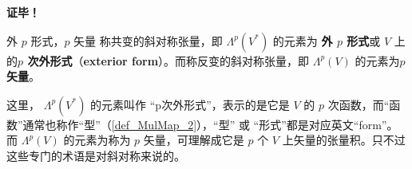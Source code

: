\textbf{证毕！}

\begin{definition}{外 $p$ 形式，$p$ 矢量}\label{def_SIofTe_2}
称共变的斜对称张量，即 $\Lambda^p(V^*)$ 的元素为 \textbf{外 $p$ 形式}或 $V$ 上的\textbf{$p$ 次外形式}（\textbf{exterior form}）。而称反变的斜对称张量，即 $\Lambda^p(V)$ 的元素为\textbf{$p$矢量}。
\end{definition}

这里， $\Lambda^p(V^*)$ 的元素叫作 “p次外形式”，表示的是它是 $V$ 的 $p$ 次函数，而“函数”通常也称作“型”（\autoref{def_MulMap_2}），“型” 或 “形式”都是对应英文“form”。而 $\Lambda^p(V)$ 的元素为称为 $p$ 矢量，可理解成它是 $p$ 个 $V$ 上矢量的张量积。只不过这些专门的术语是对斜对称来说的。

